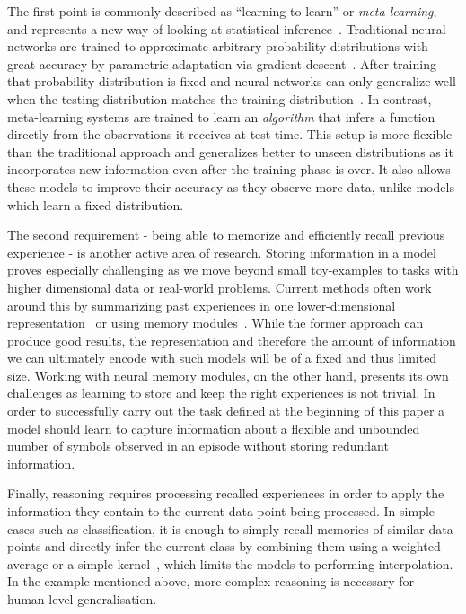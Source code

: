 \documentclass{article} \usepackage{iclr2019_conference,times}
\begin{document}
The first point is commonly described as ``learning to learn'' or \textit{meta-learning}, and represents a new way of looking at statistical inference~\citep{schmidhuber1987evolutionary, bengio1990learning, Bengio+chapter2007}. Traditional neural networks are trained to approximate arbitrary probability distributions with great accuracy by parametric adaptation via gradient descent~\citep{lecun2015deep, schmidhuber2015deep}. After training that probability distribution is fixed and neural networks can only generalize well when the testing distribution matches the training distribution~\citep{neyshabur2017exploring}. In contrast, meta-learning systems are trained to learn an \textit{algorithm} that infers a function directly from the observations it receives at test time. This setup is more flexible than the traditional approach and generalizes better to unseen distributions as it incorporates new information even after the training phase is over. It also allows these models to improve their accuracy as they observe more data, unlike models which learn a fixed distribution.

The second requirement - being able to memorize and efficiently recall previous experience - is another active area of research. Storing information in a model proves especially challenging as we move beyond small toy-examples to tasks with higher dimensional data or real-world problems. Current methods often work around this by summarizing past experiences in one lower-dimensional representation~\citep{hochreiter1997long, kingma2013auto} or using memory modules~\citep{graves2016hybrid}. While the former approach can produce good results, the representation and therefore the amount of information we can ultimately encode with such models will be of a fixed and thus limited size. Working with neural memory modules, on the other hand, presents its own challenges as learning to store and keep the right experiences is not trivial. In order to successfully carry out the task defined at the beginning of this paper a model should learn to capture information about a flexible and unbounded number of symbols observed in an episode without storing redundant information. 

Finally, reasoning requires processing recalled experiences in order to apply the information they contain to the current data point being processed. In simple cases such as classification, it is enough to simply recall memories of similar data points and directly infer the current class by combining them using a weighted average or a simple kernel~\citep{vinyals2016matching, snell2017prototypical}, which limits the models to performing interpolation. In the example mentioned above, more complex reasoning is necessary for human-level generalisation.
\end{document}
